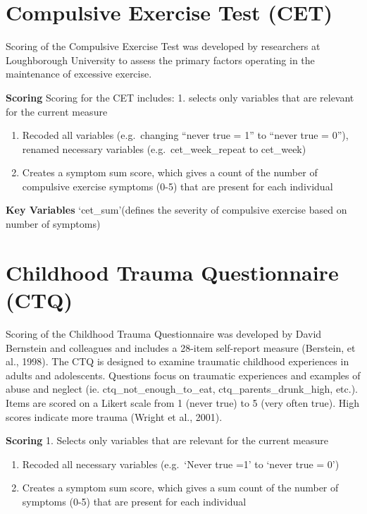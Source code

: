 \documentclass[
]{book}
\begin{document}
\hypertarget{compulsive-exercise-test-cet}{%
\section{Compulsive Exercise Test (CET)}\label{compulsive-exercise-test-cet}}

Scoring of the Compulsive Exercise Test was developed by researchers at Loughborough University to assess the primary factors operating in the maintenance of excessive exercise.

\textbf{Scoring}
Scoring for the CET includes:
1. selects only variables that are relevant for the current measure

\begin{enumerate}
\def\labelenumi{\arabic{enumi}.}
\setcounter{enumi}{1}
\item
  Recoded all variables (e.g.~changing ``never true = 1'' to ``never true = 0''), renamed necessary variables (e.g.~cet\_week\_repeat to cet\_week)
\item
  Creates a symptom sum score, which gives a count of the number of compulsive exercise symptoms (0-5) that are present for each individual
\end{enumerate}

\textbf{Key Variables}
`cet\_sum'(defines the severity of compulsive exercise based on number of symptoms)

\hypertarget{childhood-trauma-questionnaire-ctq}{%
\section{Childhood Trauma Questionnaire (CTQ)}\label{childhood-trauma-questionnaire-ctq}}

Scoring of the Childhood Trauma Questionnaire was developed by David Bernstein and colleagues and includes a 28-item self-report measure (Berstein, et al., 1998). The CTQ is designed to examine traumatic childhood experiences in adults and adolescents. Questions focus on traumatic experiences and examples of abuse and neglect (ie. ctq\_not\_enough\_to\_eat, ctq\_parents\_drunk\_high, etc.). Items are scored on a Likert scale from 1 (never true) to 5 (very often true). High scores indicate more trauma (Wright et al., 2001).

\textbf{Scoring}
1. Selects only variables that are relevant for the current measure

\begin{enumerate}
\def\labelenumi{\arabic{enumi}.}
\setcounter{enumi}{1}
\item
  Recoded all necessary variables (e.g.~`Never true =1' to `never true = 0')
\item
  Creates a symptom sum score, which gives a sum count of the number of symptoms (0-5) that are present for each individual
\end{enumerate}
\end{document}
